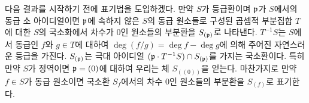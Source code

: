 	
	
	\begin{proposition}
	\end{proposition}
	
	다음 결과를 시작하기 전에 표기법을 도입하겠다.
	만약 $S$가 등급환이며 $\mathfrak{p}$가 $S$에서의 동급 소 아이디얼이면 $\mathfrak{p}$에 속하지 않은 $S$의 동급 원소들로 구성된
	곱셈적 부분집합 $T$에 대한 $S$의 국소화에서 차수가 0인 원소들의 부분환을 $S_{(\mathfrak{p})}$로 나타낸다.
	$T^{-1}S$는 $S$에서 동급인 $f$와 $g\in T$에 대하여 $\deg(f/g)=\deg f-\deg g$에 의해 주어진 자연스러운 등급을 가진다.
	$S_{(\mathfrak{p})}$는 극대 아이디얼 $(\mathfrak{p}\cdot T^{-1}S)\cap S_{(\mathfrak{p})}$를 가지는 국소환이다.
	특히 만약 $S$가 정역이면 $\mathfrak{p}=(0)$에 대하여 우리는 체 $S_{((0))}$을 얻는다.
	마찬가지로 만약 $f\in S$가 동급 원소이면 국소환 $S_f$에서의 차수 0인 원소들의 부분환을 $S_{(f)}$로 표기한다.
	
